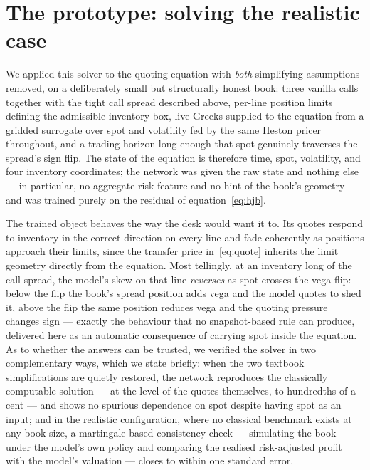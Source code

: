 \documentclass[11pt,a4paper]{article}
\begin{document}
\section{The prototype: solving the realistic case}

We applied this solver to the quoting equation with \emph{both}
simplifying assumptions removed, on a deliberately small but
structurally honest book: three vanilla calls together with the tight
call spread described above, per-line position limits defining the
admissible inventory box, live Greeks supplied to the equation from a
gridded surrogate over spot and volatility fed by the same Heston pricer
throughout, and a trading horizon long enough that spot genuinely
traverses the spread's sign flip. The state of the equation is
therefore time, spot, volatility, and four inventory coordinates; the
network was given the raw state and nothing else --- in particular, no
aggregate-risk feature and no hint of the book's geometry --- and was
trained purely on the residual of equation~\eqref{eq:hjb}.

The trained object behaves the way the desk would want it to. Its quotes
respond to inventory in the correct direction on every line and fade
coherently as positions approach their limits, since the transfer price
in~\eqref{eq:quote} inherits the limit geometry directly from the
equation. Most tellingly, at an inventory long of the call spread, the
model's skew on that line \emph{reverses} as spot crosses the vega flip:
below the flip the book's spread position adds vega and the model quotes
to shed it, above the flip the same position reduces vega and the
quoting pressure changes sign --- exactly the behaviour that no
snapshot-based rule can produce, delivered here as an automatic
consequence of carrying spot inside the equation. As to whether the
answers can be trusted, we verified the solver in two complementary
ways, which we state briefly: when the two textbook simplifications are
quietly restored, the network reproduces the classically computable
solution --- at the level of the quotes themselves, to hundredths of a
cent --- and shows no spurious dependence on spot despite having spot as
an input; and in the realistic configuration, where no classical
benchmark exists at any book size, a martingale-based consistency check
--- simulating the book under the model's own policy and comparing the
realised risk-adjusted profit with the model's valuation --- closes to
within one standard error.
\end{document}
